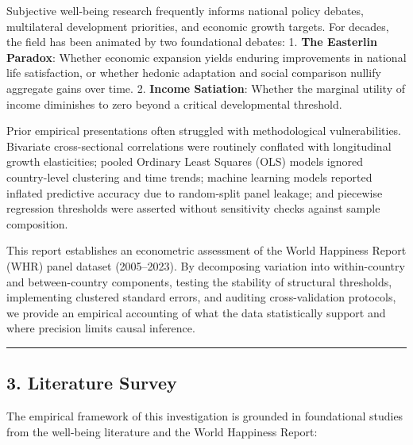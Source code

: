 \documentclass[
]{article}
\begin{document}
Subjective well-being research frequently informs national policy
debates, multilateral development priorities, and economic growth
targets. For decades, the field has been animated by two foundational
debates: 1. \textbf{The Easterlin Paradox}: Whether economic expansion
yields enduring improvements in national life satisfaction, or whether
hedonic adaptation and social comparison nullify aggregate gains over
time. 2. \textbf{Income Satiation}: Whether the marginal utility of
income diminishes to zero beyond a critical developmental threshold.

Prior empirical presentations often struggled with methodological
vulnerabilities. Bivariate cross-sectional correlations were routinely
conflated with longitudinal growth elasticities; pooled Ordinary Least
Squares (OLS) models ignored country-level clustering and time trends;
machine learning models reported inflated predictive accuracy due to
random-split panel leakage; and piecewise regression thresholds were
asserted without sensitivity checks against sample composition.

This report establishes an econometric assessment of the World Happiness
Report (WHR) panel dataset (2005--2023). By decomposing variation into
within-country and between-country components, testing the stability of
structural thresholds, implementing clustered standard errors, and
auditing cross-validation protocols, we provide an empirical accounting
of what the data statistically support and where precision limits causal
inference.

\begin{center}\rule{0.5\linewidth}{0.5pt}\end{center}

\hypertarget{literature-survey}{%
\subsection{3. Literature Survey}\label{literature-survey}}

The empirical framework of this investigation is grounded in
foundational studies from the well-being literature and the World
Happiness Report:
\end{document}
